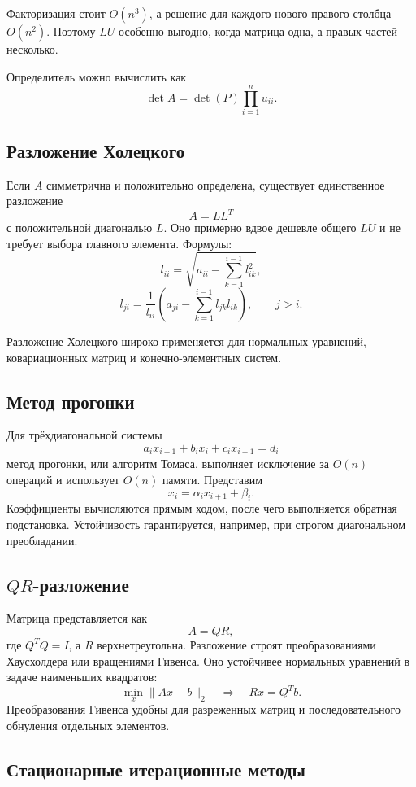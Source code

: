 Факторизация стоит $O(n^3)$, а решение для каждого нового правого столбца ---
$O(n^2)$. Поэтому $LU$ особенно выгодно, когда матрица одна, а правых частей
несколько.

Определитель можно вычислить как
\[
    \det A=\det(P)\prod_{i=1}^{n}u_{ii}.
\]

\subsection{Разложение Холецкого}

Если $A$ симметрична и положительно определена, существует единственное
разложение
\[
    A=LL^{T}
\]
с положительной диагональю $L$. Оно примерно вдвое дешевле общего $LU$ и не
требует выбора главного элемента. Формулы:
\[
 l_{ii}=\sqrt{a_{ii}-\sum_{k=1}^{i-1}l_{ik}^2},
\]
\[
 l_{ji}=\frac{1}{l_{ii}}
 \left(a_{ji}-\sum_{k=1}^{i-1}l_{jk}l_{ik}\right),
 \qquad j>i.
\]

Разложение Холецкого широко применяется для нормальных уравнений, ковариационных
матриц и конечно-элементных систем.

\subsection{Метод прогонки}

Для трёхдиагональной системы
\[
 a_i x_{i-1}+b_i x_i+c_i x_{i+1}=d_i
\]
метод прогонки, или алгоритм Томаса, выполняет исключение за $O(n)$ операций и
использует $O(n)$ памяти. Представим
\[
    x_i=\alpha_i x_{i+1}+\beta_i.
\]
Коэффициенты вычисляются прямым ходом, после чего выполняется обратная
подстановка. Устойчивость гарантируется, например, при строгом диагональном
преобладании.

\subsection{$QR$-разложение}

Матрица представляется как
\[
    A=QR,
\]
где $Q^TQ=I$, а $R$ верхнетреугольна. Разложение строят преобразованиями
Хаусхолдера или вращениями Гивенса. Оно устойчивее нормальных уравнений в задаче
наименьших квадратов:
\[
    \min_x\|Ax-b\|_2
    \quad\Longrightarrow\quad
    Rx=Q^Tb.
\]
Преобразования Гивенса удобны для разреженных матриц и последовательного
обнуления отдельных элементов.

\subsection{Стационарные итерационные методы}


